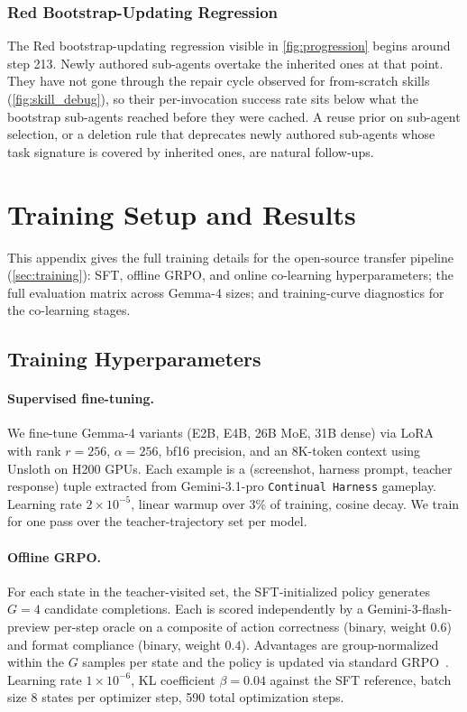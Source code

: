 \documentclass[11pt]{article}
\begin{document}
\subsubsection{Red Bootstrap-Updating Regression}\label{app:red_regression}

The Red bootstrap-updating regression visible in \cref{fig:progression} begins around step 213. Newly authored sub-agents overtake the inherited ones at that point. They have not gone through the repair cycle observed for from-scratch skills (\cref{fig:skill_debug}), so their per-invocation success rate sits below what the bootstrap sub-agents reached before they were cached. A reuse prior on sub-agent selection, or a deletion rule that deprecates newly authored sub-agents whose task signature is covered by inherited ones, are natural follow-ups.


\section{Training Setup and Results}\label{app:training}

This appendix gives the full training details for the open-source transfer pipeline (\cref{sec:training}): SFT, offline GRPO, and online co-learning hyperparameters; the full evaluation matrix across Gemma-4 sizes; and training-curve diagnostics for the co-learning stages.

\subsection{Training Hyperparameters}\label{app:training:hyperparams}

\paragraph{Supervised fine-tuning.} We fine-tune Gemma-4 variants (E2B, E4B, 26B MoE, 31B dense) via LoRA with rank $r{=}256$, $\alpha{=}256$, bf16 precision, and an 8K-token context using Unsloth on H200 GPUs. Each example is a (screenshot, harness prompt, teacher response) tuple extracted from Gemini-3.1-pro \texttt{Continual Harness} gameplay. Learning rate $2\times10^{-5}$, linear warmup over 3\% of training, cosine decay. We train for one pass over the teacher-trajectory set per model.

\paragraph{Offline GRPO.} For each state in the teacher-visited set, the SFT-initialized policy generates $G{=}4$ candidate completions. Each is scored independently by a Gemini-3-flash-preview per-step oracle on a composite of action correctness (binary, weight $0.6$) and format compliance (binary, weight $0.4$). Advantages are group-normalized within the $G$ samples per state and the policy is updated via standard GRPO~\citep{shao2024deepseekmath}. Learning rate $1\times10^{-6}$, KL coefficient $\beta{=}0.04$ against the SFT reference, batch size 8 states per optimizer step, 590 total optimization steps.
\end{document}
